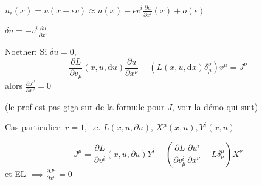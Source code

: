 \documentclass[a4paper,11pt]{article}
\renewcommand{\d}{{\mathrm{d}}}
\newcommand{\dr}[2]{\frac{\partial {#1}}{\partial{#2}}}
\begin{document}
$u_\epsilon(x) = u(x-\epsilon v) \approx u(x) - \epsilon v^i \dr u {x^i}(x) + o(\epsilon)$

$\delta u = - v^i \dr u {x^i}$

Noether: Si $\delta u = 0$, 
$$\dr L {v_\mu} (x,u,\d u) \dr u {x^\nu} - (L(x,u, \d x) \delta_\mu^\nu) v^\mu = J^\nu$$
alors $\dr{J^\nu}{x^\nu} = 0$

(le prof est pas giga sur de la formule pour $J$, voir la démo qui suit)

Cas particulier:
$r=1$, i.e. $L(x,u,\partial u)$, $X^\mu (x,u), Y^i(x,u)$

$$J^\mu = \dr L {v^i} (x,u,\partial u) Y^i - (\dr L {v^i_\mu} \dr{u^i}{x^\nu} - L \delta_\nu^\mu) X^\nu$$
et EL $\implies \dr{J^\mu}{x^\mu}=0$
\end{document}
